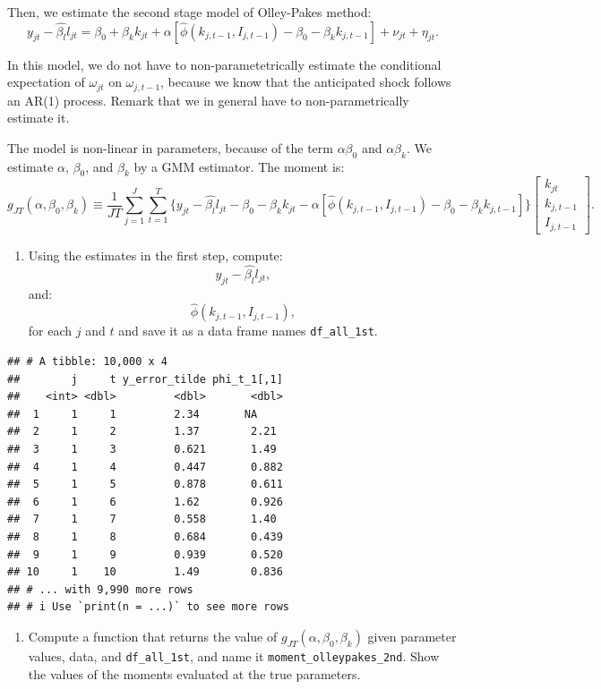 \documentclass[
]{book}
\providecommand{\tightlist}{%
  \setlength{\itemsep}{0pt}\setlength{\parskip}{0pt}}
\begin{document}
Then, we estimate the second stage model of Olley-Pakes method:
\[
y_{jt} - \hat{\beta_l} l_{jt} = \beta_0 + \beta_k k_{jt} + \alpha[\hat{\phi}(k_{j, t - 1}, I_{j, t - 1}) - \beta_0 - \beta_k k_{j, t-1}] + \nu_{jt} + \eta_{jt}.
\]

In this model, we do not have to non-parametetrically estimate the conditional expectation of \(\omega_{jt}\) on \(\omega_{j, t - 1}\), because we know that the anticipated shock follows an AR(1) process. Remark that we in general have to non-parametrically estimate it.

The model is non-linear in parameters, because of the term \(\alpha \beta_0\) and \(\alpha \beta_k\). We estimate \(\alpha\), \(\beta_0\), and \(\beta_k\) by a GMM estimator. The moment is:
\[
g_{JT}(\alpha, \beta_0, \beta_k) \equiv \frac{1}{JT}\sum_{j = 1}^J \sum_{t = 1}^T \{y_{jt} - \hat{\beta_l} l_{jt} - \beta_0 - \beta_k k_{jt} - \alpha[\hat{\phi}(k_{j, t - 1}, I_{j, t - 1}) - \beta_0 - \beta_k k_{j, t-1}]\} 
\begin{bmatrix}
k_{jt} \\
k_{j, t - 1} \\
I_{j, t - 1}
\end{bmatrix}.
\]

\begin{enumerate}
\def\labelenumi{\arabic{enumi}.}
\setcounter{enumi}{4}
\tightlist
\item
  Using the estimates in the first step, compute:
  \[
  y_{jt} - \hat{\beta_l} l_{jt},
  \]
  and:
  \[
  \hat{\phi}(k_{j, t - 1}, I_{j, t - 1}),
  \]
  for each \(j\) and \(t\) and save it as a data frame names \texttt{df\_all\_1st}.
\end{enumerate}

\begin{verbatim}
## # A tibble: 10,000 x 4
##        j     t y_error_tilde phi_t_1[,1]
##    <int> <dbl>         <dbl>       <dbl>
##  1     1     1         2.34       NA    
##  2     1     2         1.37        2.21 
##  3     1     3         0.621       1.49 
##  4     1     4         0.447       0.882
##  5     1     5         0.878       0.611
##  6     1     6         1.62        0.926
##  7     1     7         0.558       1.40 
##  8     1     8         0.684       0.439
##  9     1     9         0.939       0.520
## 10     1    10         1.49        0.836
## # ... with 9,990 more rows
## # i Use `print(n = ...)` to see more rows
\end{verbatim}

\begin{enumerate}
\def\labelenumi{\arabic{enumi}.}
\setcounter{enumi}{5}
\tightlist
\item
  Compute a function that returns the value of \(g_{JT}(\alpha, \beta_0, \beta_k)\) given parameter values, data, and \texttt{df\_all\_1st}, and name it \texttt{moment\_olleypakes\_2nd}. Show the values of the moments evaluated at the true parameters.
\end{enumerate}
\end{document}
